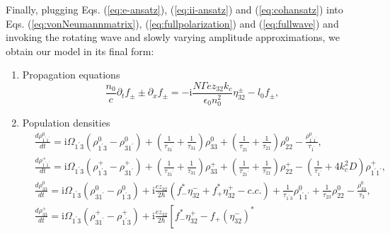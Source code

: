 \documentclass[10pt,letterpaper]{article}%
\begin{document}
Finally, plugging Eqs. (\ref{eq:e-ansatz}), (\ref{eq:ii-ansatz}) and
(\ref{eq:cohansatz}) into Eqs. (\ref{eq:vonNeumannmatrix}),
(\ref{eq:fullpolarization}) and (\ref{eq:fullwave}) and invoking the rotating
wave and slowly varying amplitude approximations, we obtain our model in its
final form:

\begin{enumerate}
\item { Propagation equations
\begin{equation}
\frac{n_{0}}{c}\partial_{t}f_{\pm}\pm\partial_{x}f_{\pm}=-\mathrm{i}%
\frac{N\Gamma ez_{32}k_{c}}{\epsilon_{0}n_{0}^{2}}\eta_{32}^{\pm}-l_{0}f_{\pm
}, \label{eq:rtwave}%
\end{equation}
}

\item { Population densities%
\begin{subequations}
\label{eq:diagonaldm}%
\begin{align}
&  \frac{d\rho_{1^{\prime}1^{\prime}}^{0}}{dt}=\mathrm{i}\Omega_{1^{\prime}%
3}\left(  \rho_{1^{\prime}3}^{0}-\rho_{31^{\prime}}^{0}\right)  +\left(
\frac{1}{\tau_{31^{\prime}}}+\frac{1}{\tau_{31}}\right)  \rho_{33}^{0}+\left(
\frac{1}{\tau_{21^{\prime}}}+\frac{1}{\tau_{21}}\right)  \rho_{22}^{0}%
-\frac{\rho_{1^{\prime}1^{\prime}}^{0}}{\tau_{1^{\prime}}},\label{eq:rho11-dm}%
\\
&  \frac{d\rho_{1^{\prime}1^{\prime}}^{+}}{dt}=\mathrm{i}\Omega_{1^{\prime}%
3}\left(  \rho_{1^{\prime}3}^{+}-\rho_{31^{\prime}}^{+}\right)  +\left(
\frac{1}{\tau_{31^{\prime}}}+\frac{1}{\tau_{31}}\right)  \rho_{33}^{+}+\left(
\frac{1}{\tau_{21^{\prime}}}+\frac{1}{\tau_{21}}\right)  \rho_{22}^{+}-\left(
\frac{1}{\tau_{1^{\prime}}}+4k_{c}^{2}D\right)  \rho_{1^{\prime}1^{\prime}%
}^{+},\label{eq:rtpop1grating}\\
&  \frac{d\rho_{33}^{0}}{dt}=\mathrm{i}\Omega_{1^{\prime}3}\left(
\rho_{31^{\prime}}^{0}-\rho_{1^{\prime}3}^{0}\right)  +\mathrm{i}\frac
{ez_{32}}{2\hbar}\left(  f_{-}^{\ast}\eta_{32}^{-}+f_{+}^{\ast}\eta_{32}%
^{+}-c.c.\right)  +\frac{1}{\tau_{1^{\prime}3}}\rho_{1^{\prime}1^{\prime}}%
^{0}+\frac{1}{\tau_{23}}\rho_{22}^{0}-\frac{\rho_{33}^{0}}{\tau_{3}},\\
&  \frac{d\rho_{33}^{+}}{dt}=\mathrm{i}\Omega_{1^{\prime}3}\left(
\rho_{31^{\prime}}^{+}-\rho_{1^{\prime}3}^{+}\right)  +\mathrm{i}\frac
{ez_{32}}{2\hbar}\left[  f_{-}^{\ast}\eta_{32}^{+}-f_{+}(\eta_{32}^{-})^{\ast
}
\end{align}
\end{subequations}}
\end{enumerate}
\end{document}
